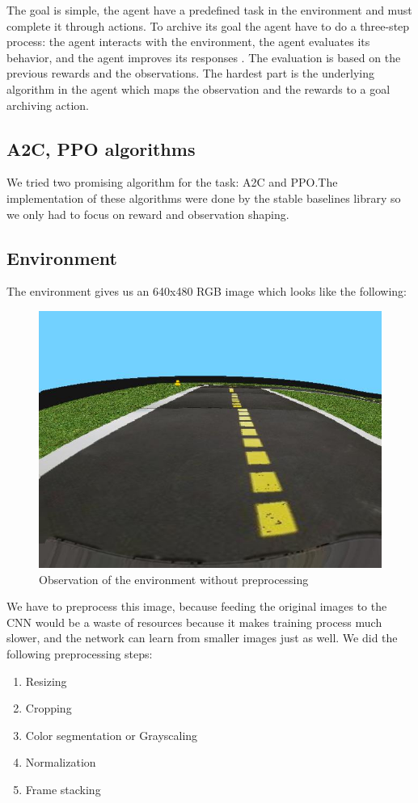 \documentclass{article}
\begin{document}
The goal is simple, the agent have a predefined task in the environment and must complete it through actions. To archive its goal the agent have to do a three-step process: the agent interacts with the environment, the agent evaluates its behavior, and the agent improves its responses \cite{dlr_book}. The evaluation is based on the previous rewards and the observations. The hardest part is the underlying algorithm in the agent which maps the observation and the rewards to a goal archiving action.

\subsection{\normalsize{A2C, PPO algorithms}}

We tried two promising algorithm for the task: A2C and PPO.The implementation of these algorithms were done by the stable baselines library  \cite{stablebase} so we only had to focus on reward and observation shaping.

\subsection{\normalsize{Environment}}

The environment gives us an 640x480 RGB image which looks like the following:
\begin{figure}[h!]
	\centering
	\includegraphics[width=0.5\linewidth]{rawobs.jpg}
	\caption{Observation of the environment without preprocessing}
\end{figure}
We have to preprocess this image, because feeding the original images to the CNN would be a waste of resources because it makes training process much slower, and the network can learn from smaller images just as well. We did the following preprocessing steps:
\begin{enumerate}
	\item Resizing
	\item Cropping
	\item Color segmentation or Grayscaling
	\item Normalization
	\item Frame stacking
\end{enumerate}
\end{document}
